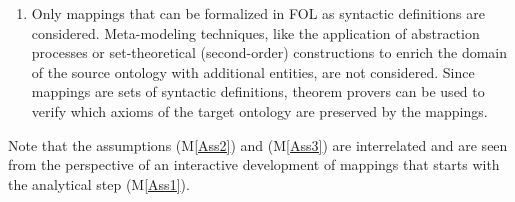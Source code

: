\documentclass[ao]{iosart2x}
\newcommand{\nb}[1]{\textcolor{red}{$|$}\marginpar{\hspace*{-0cm}\parbox{20mm}{\scriptsize\raggedright\textcolor{red}{#1}}}}
\begin{document}
\begin{enumerate}[({\bf M}1)]
\item \label{Ass3} Only mappings that can be formalized in FOL as syntactic definitions are considered. %
Meta-modeling techniques, like the application of abstraction processes or set-theoretical (second-order) constructions to enrich the domain of the source %
ontology with additional entities, are not considered. %
Since mappings are sets of syntactic definitions, theorem provers can be used to verify which axioms of the target ontology are preserved by the mappings.%
\end{enumerate}

Note that the assumptions (M\ref{Ass2}) and (M\ref{Ass3}) are interrelated and are seen from the perspective of an interactive development of mappings that starts with the analytical step (M\ref{Ass1}). 
\end{document}
